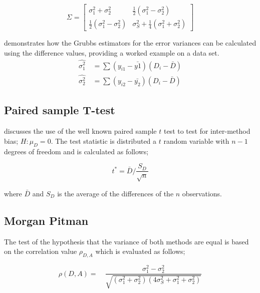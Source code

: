 \documentclass[12pt, a4paper]{report}
\theoremstyle{plain}
\theoremstyle{definition}
\theoremstyle{remark}
\begin{document}
\begin{equation}
\Sigma = \left[\begin{matrix}
\sigma^{2}_{1}+\sigma^{2}_{2}&\frac{1}{2}(\sigma^{2}_{1}-\sigma^{2}_{2})\\
\frac{1}{2}(\sigma^{2}_{1}-\sigma^{2}_{2})&\sigma^{2}_{S}+
\frac{1}{4}(\sigma^{2}_{1}+\sigma^{2}_{2})
\end{matrix} \right]
\end{equation}





\citet{Kinsella} demonstrates how the Grubbs estimators for the
error variances can be calculated using the difference values,
providing a worked example on a data set.
\begin{eqnarray}
\hat{\sigma^{2}_{1}}
\quad=\sum{(y_{i1}-\bar{y{1}})(D_{i}-\bar{D})}\\
\hat{\sigma^{2}_{2}} \quad=
\sum{(y_{i2}-\bar{y_{2}})(D_{i}-\bar{D})} \nonumber
\end{eqnarray}

\subsection{Paired sample T-test} \citet{Bartko} discusses the use
of the well known paired sample $t$ test to test for inter-method
bias; $H: \mu_{D}=0$. The test statistic is distributed a $t$
random variable with $n-1$ degrees of freedom and is calculated as
follows;

\begin{equation}
t^{*} = \bar{D}/ \frac{S_{D}}{\sqrt{n}}
\end{equation}

where $\bar{D}$ and $S_{D}$ is the average of the differences of
the $n$ observations.

\subsection{Morgan Pitman}

The test of the hypothesis that the variance of both methods are
equal is based on the correlation value $\rho_{D,A}$ which is
evaluated as follows;

\begin{equation}
\rho(D,A)=\quad\frac{\sigma^{2}_{1}-\sigma^{2}_{2}}{\sqrt{(\sigma^{2}_{1}+\sigma^{2}_{2})(4\sigma^{2}_{S}+\sigma^{2}_{1}+\sigma^{2}_{2})}}
\end{equation}
\end{document}

